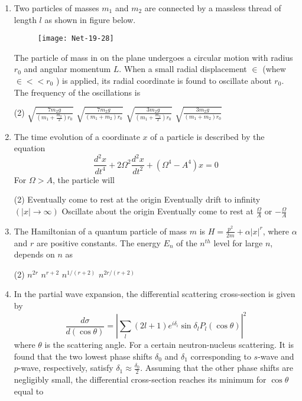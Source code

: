 \begin{enumerate}
\begin{tasks}
\end{tasks}
\item Two particles of masses $m_{1}$ and $m_{2}$ are connected by a massless thread of length $l$ as shown in figure below.
\begin{figure}[H]
	\centering
	\texttt{[image: Net-19-28]}
\end{figure}
The particle of mass in on the plane undergoes a circular motion with radius $r_{0}$ and angular momentum $L$. When a small radial displacement $\in$ (whew $\in<<r_{0}$ ) is applied, its radial coordinate is found to oscillate about $r_{0}$. The frequency of the oscillations is
 \begin{tasks}(2)
	\task[\textbf{a.}] $\sqrt{\frac{7 m_{2} g}{\left(m_{1}+\frac{m_{2}}{2}\right) r_{0}}}$
	\task[\textbf{b.}]$\sqrt{\frac{7 m_{2} g}{\left(m_{1}+m_{2}\right) r_{0}}}$
	\task[\textbf{c.}]$\sqrt{\frac{3 m_{2} g}{\left(m_{1}+\frac{m_{2}}{2}\right) r_{0}}}$
	\task[\textbf{d.}] $\sqrt{\frac{3 m_{2} g}{\left(m_{1}+m_{2}\right) r_{0}}}$
\end{tasks}
\item  The time evolution of a coordinate $x$ of a particle is described by the equation
$$
\frac{d^{2} x}{d t^{4}}+2 \Omega^{2} \frac{d^{2} x}{d t^{2}}+\left(\Omega^{4}-A^{4}\right) x=0
$$
For $\Omega>A$, the particle will
 \begin{tasks}(2)
	\task[\textbf{a.}]Eventually come to rest at the origin
	\task[\textbf{b.}] Eventually drift to infinity $(|x| \rightarrow \infty)$
	\task[\textbf{c.}] Oscillate about the origin
	\task[\textbf{d.}] Eventually come to rest at $\frac{\Omega}{A}$ or $-\frac{\Omega}{A}$
\end{tasks}
\item  The Hamiltonian of a quantum particle of mass $m$ is $H=\frac{p^{2}}{2 m}+\alpha|x|^{r}$, where $\alpha$ and $r$ are positive constants. The energy $E_{n}$ of the $n^{t h}$ level for large $n$, depends on $n$ as
 \begin{tasks}(2)
	\task[\textbf{a.}]$n^{2 r}$
	\task[\textbf{b.}]$n^{r+2}$
	\task[\textbf{c.}]$n^{1 /(r+2)}$
	\task[\textbf{d.}] $n^{2 r /(r+2)}$
\end{tasks}
\item In the partial wave expansion, the differential scattering cross-section is given by
$$
\frac{d \sigma}{d(\cos \theta)}=\left|\sum_{l}(2 l+1) e^{i \delta_{i}} \sin \delta_{l} P_{l}(\cos \theta)\right|^{2}
$$
where $\theta$ is the scattering angle. For a certain neutron-nucleus scattering. It is found that the two lowest phase shifts $\delta_{0}$ and $\delta_{1}$ corresponding to $s$-wave and $p$-wave, respectively, satisfy $\delta_{1} \approx \frac{\delta_{0}}{2}$. Assuming that the other phase shifts are negligibly small, the differential cross-section reaches its minimum for $\cos \theta$ equal to

\end{enumerate}

